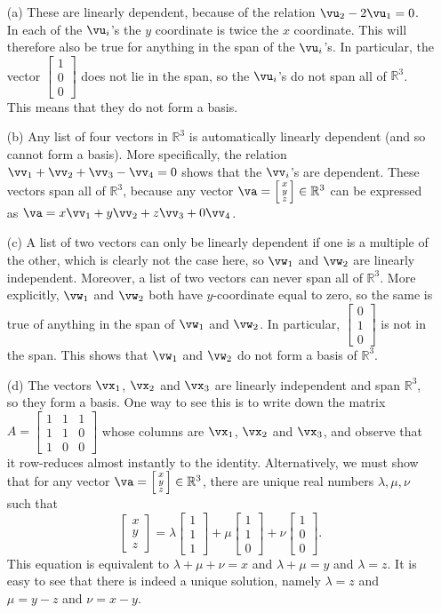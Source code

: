 \documentclass[a4paper]{amsart}
\newcommand{\R}         {{\mathbb{R}}}
\newcommand{\bsm}       {\left[\begin{smallmatrix}}
\newcommand{\esm}       {\end{smallmatrix}\right]}
\newcommand{\lm}        {\lambda}
\renewcommand{\:}{\colon}
\theoremstyle{definition}
\newenvironment{solution}{{\noindent \bf Solution:}}{}
\begin{document}
\begin{solution}
 \begin{itemize}
  \item[(a)] These are linearly dependent, because of the
   relation $\vu_2-2\vu_1=0$.  In each of the $\vu_i$'s the
   $y$ coordinate is twice the $x$ coordinate.  This will
   therefore also be true for anything in the span of the
   $\vu_i$'s.  In particular, the vector $\bsm 1\\0\\0\esm$
   does not lie in the span, so the $\vu_i$'s do not span
   all of $\R^3$.  This means that they do not form a basis.
  \item[(b)] Any list of four vectors in $\R^3$ is
   automatically linearly dependent (and so cannot form a
   basis).  More specifically, the relation
   $\vv_1+\vv_2+\vv_3-\vv_4=0$ shows that the $\vv_i$'s are
   dependent.  These vectors span all of $\R^3$, because any
   vector $\va=\bsm x\\ y\\ z\esm\in\R^3$ can be expressed
   as $\va=x\vv_1+y\vv_2+z\vv_3+0\vv_4$.
  \item[(c)] A list of two vectors can only be linearly
   dependent if one is a multiple of the other, which is
   clearly not the case here, so $\vw_1$ and $\vw_2$ are
   linearly independent.  Moreover, a list of two vectors
   can never span all of $\R^3$.  More explicitly, $\vw_1$
   and $\vw_2$ both have $y$-coordinate equal to zero, so
   the same is true of anything in the span of $\vw_1$ and
   $\vw_2$.  In particular, $\bsm 0\\1\\0\esm$ is not in the
   span.  This shows that $\vw_1$ and $\vw_2$ do not form a
   basis of $\R^3$.
  \item[(d)] The vectors $\vx_1$, $\vx_2$ and $\vx_3$ are
   linearly independent and span $\R^3$, so they form a
   basis.  One way to see this is to write down the matrix
   $A=\bsm 1&1&1\\1&1&0\\1&0&0\esm$ whose columns are
   $\vx_1$, $\vx_2$ and $\vx_3$, and observe that it
   row-reduces almost instantly to the identity.
   Alternatively, we must show that for any vector
   $\va=\bsm x\\ y\\ z\esm\in\R^3$, there are unique real
   numbers $\lm,\mu,\nu$ such that 
   \[ \bsm x\\ y\\ z\esm =
       \lm\bsm 1\\1\\1\esm +
       \mu\bsm 1\\1\\0\esm +
       \nu\bsm 1\\0\\0\esm.
   \] 
   This equation is equivalent to $\lm+\mu+\nu=x$ and
   $\lm+\mu=y$ and $\lm=z$.  It is easy to see that there is
   indeed a unique solution, namely $\lm=z$ and $\mu=y-z$ and
   $\nu=x-y$. 
 \end{itemize}
\end{solution}
\end{document}
